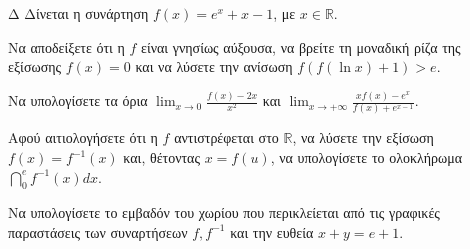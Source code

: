 \begin{thema}{Δ}
Δίνεται η συνάρτηση $f(x) = e^x + x - 1$, με $x \in \mathbb{R}$.
\begin{erwthma}
    \item Να αποδείξετε ότι η $f$ είναι γνησίως αύξουσα, να βρείτε τη μοναδική ρίζα της εξίσωσης $f(x) = 0$ και να λύσετε την ανίσωση $f(f(\ln x) + 1) > e$.
    \item Να υπολογίσετε τα όρια $\displaystyle\lim_{x\to 0} \frac{f(x) - 2x}{x^2}$ και $\displaystyle\lim_{x\to +\infty} \frac{x f(x) - e^x}{f(x) + e^{x-1}}$.
    \item Αφού αιτιολογήσετε ότι η $f$ αντιστρέφεται στο $\mathbb{R}$, να λύσετε την εξίσωση $f(x) = f^{-1}(x)$ και, θέτοντας $x = f(u)$, να υπολογίσετε το ολοκλήρωμα $\displaystyle \dint_0^e f^{-1}(x) dx$.
    \item Να υπολογίσετε το εμβαδόν του χωρίου που περικλείεται από τις γραφικές παραστάσεις των συναρτήσεων $f, f^{-1}$ και την ευθεία $x+y=e+1$.
\end{erwthma}
\end{thema}
